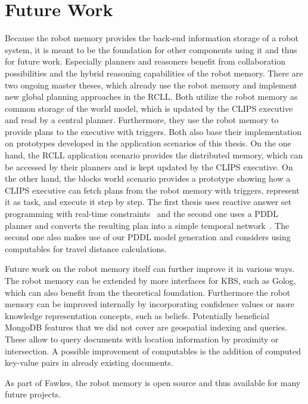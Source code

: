\section{Future Work}
\label{sec:future-work}
Because the robot memory provides the back-end information storage of
a robot system, it is meant to be the foundation for other components
using it and thus for future work. Especially planners and reasoners
benefit from collaboration possibilities and the hybrid reasoning
capabilities of the robot memory. There are two ongoing master theses,
which already use the robot memory and implement new global planning
approaches in the RCLL. Both utilize the robot memory as common
storage of the world model, which is updated by the CLIPS executive
and read by a central planner. Furthermore, they use the robot memory
to provide plans to the executive with triggers. Both also base their
implementation on prototypes developed in the application scenarios of
this thesis. On the one hand, the RCLL application scenario provides
the distributed memory, which can be accessed by their planners and is
kept updated by the CLIPS executive. On the other hand, the blocks
world scenario provides a prototype showing how a CLIPS executive can
fetch plans from the robot memory with triggers, represent it as task,
and execute it step by step. The first thesis uses reactive answer set
programming with real-time constraints~\cite{bjoern-thesis} and the
second one uses a PDDL planner and converts the resulting plan into a
simple temporal network~\cite{matthias-thesis}. The second one also
makes use of our PDDL model generation and considers using
computables for travel distance calculations.

Future work on the robot memory itself can further improve it in
various ways. The robot memory can be extended by more interfaces for
KBS, such as Golog, which can also benefit from the theoretical
foundation. Furthermore the robot memory can be improved internally by
incorporating confidence values or more knowledge representation
concepts, such as beliefs. Potentially beneficial MongoDB features
that we did not cover are geospatial indexing and queries. These allow
to query documents with location information by proximity or
intersection. A possible improvement of computables is the addition
of computed key-value pairs in already existing documents.


As part of Fawkes, the robot memory is open source and thus available
for many future projects.
